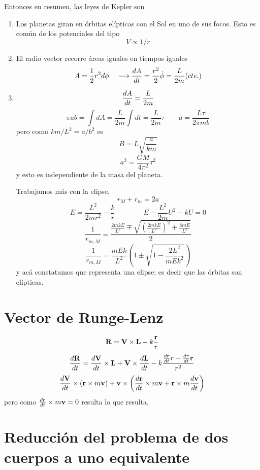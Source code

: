 \documentclass[10pt,oneside]{CBFT_article}
\begin{document}
Entonces en resumen, las leyes de Kepler son
\begin{enumerate}
 \item Los planetas giran en órbitas elípticas con el Sol en uno de sus focos. Esto es común de los potenciales del tipo 
	\[
		V \propto 1/r
	\]
 \item El radio vector recorre áreas iguales en tiempos iguales
	\[
		A = \frac{1}{2} r^2 d\phi \quad \longrightarrow \frac{d^{\hspace{-0.05em}} {A}}{d {t}^{\hspace{-0.05em}}} = \frac{r^2}{2} \dot{\phi} = \frac{L}{2m} (cte.)
	\]
 \item 
 \[
	\frac{d^{\hspace{-0.05em}} {A}}{d {t}^{\hspace{-0.05em}}} = \frac{L}{2m}
 \]
 \[
	\pi a b = \int dA = \frac{L}{2m} \int dt = \frac{L}{2m} \tau \qquad a = \frac{L\tau}{2\pi m b} 
 \]
 pero como $km/L^2 = a/b^2$ es
 \[
	B = L \sqrt{\frac{a}{k m}}
 \]
 \[
	a^3 = \frac{GM}{4\pi^2} \tau^2
 \]
 y esto es independiente de la masa del planeta.
 
 Trabajamos más con la elipse,
 \[
	r_M + r_m = 2a
 \]
 \[
	E = \frac{L^2}{2mr^2} - \frac{k}{r}	\qquad\qquad E - \frac{L^2}{2m} U^2 - kU = 0
 \]
 \[
	\frac{1}{r_{m,M}} = \frac{ \frac{2mkE}{L^2} \mp \sqrt{ \left(\frac{2mkE}{L^2}\right)^2 + \frac{8mE}{L^2} } }{2}
 \]
 \[
	\frac{1}{r_{m,M}} = \frac{mEk}{L^2} \left( 1 \pm \sqrt{1 - \frac{2L^2}{mEk^2}}\right) 
 \]
 y acá constatamos que representa una elipse; es decir que las órbitas son elípticas.
\end{enumerate}

\section{Vector de Runge-Lenz}

\[
	\vb{R} = \vb{V} \times \vb{L} - k\frac{\vb{r}}{r}
\]
\[
	\dtot{\vb{R}}{t} = \dtot{\vb{V}}{t} \times \vb{L} + \vb{V} \times \dtot{\vb{L}}{t} -
	k\frac{\dtot{\vb{r}}{t} r - \dtot{r}{t} \vb{r}  }{r^2}
\]
\[
	\dtot{\vb{V}}{t} \times ( \vb{r} \times m\vb{v} ) +
	\vb{v} \times \left( \dtot{\vb{r}}{t} \times m\vb{v} + \vb{r} \times m\dtot{\vb{v}}{t} \right)
\]
pero como $\dtot{\vb{r}}{t} \times m\vb{v} = 0$ resulta lo que resulta.

\section{Reducción del problema de dos cuerpos a uno equivalente}
\end{document}
